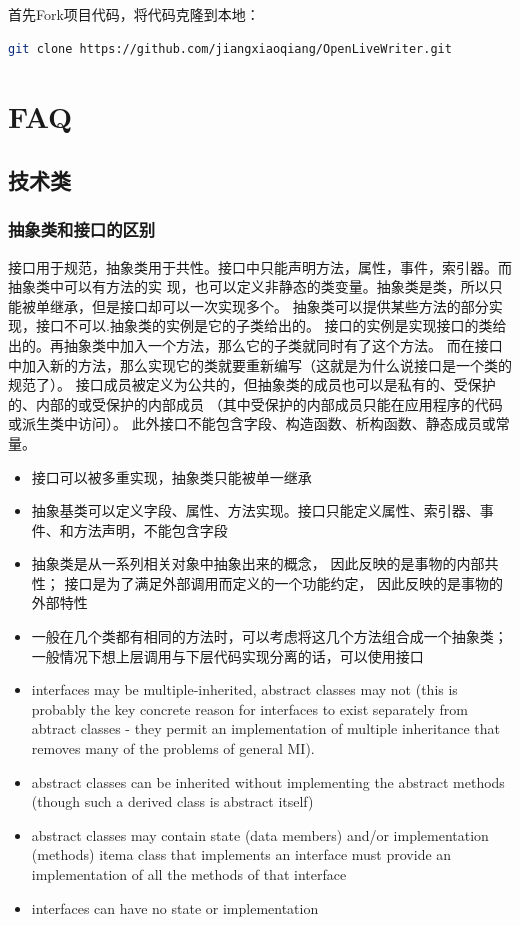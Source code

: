 \documentclass{book}
\begin{document}
首先Fork项目代码，将代码克隆到本地：

\begin{lstlisting}[language=Bash]
git clone https://github.com/jiangxiaoqiang/OpenLiveWriter.git
\end{lstlisting}

\chapter{FAQ}

\clearpage

\section{技术类}

\subsection{抽象类和接口的区别}

接口用于规范，抽象类用于共性。接口中只能声明方法，属性，事件，索引器。而抽象类中可以有方法的实
现，也可以定义非静态的类变量。抽象类是类，所以只能被单继承，但是接口却可以一次实现多个。
抽象类可以提供某些方法的部分实现，接口不可以.抽象类的实例是它的子类给出的。
接口的实例是实现接口的类给出的。再抽象类中加入一个方法，那么它的子类就同时有了这个方法。
而在接口中加入新的方法，那么实现它的类就要重新编写（这就是为什么说接口是一个类的规范了）。
接口成员被定义为公共的，但抽象类的成员也可以是私有的、受保护的、内部的或受保护的内部成员
（其中受保护的内部成员只能在应用程序的代码或派生类中访问）。
此外接口不能包含字段、构造函数、析构函数、静态成员或常量。 


\begin{itemize}
\item{接口可以被多重实现，抽象类只能被单一继承}
\item{抽象基类可以定义字段、属性、方法实现。接口只能定义属性、索引器、事件、和方法声明，不能包含字段}
\item{抽象类是从一系列相关对象中抽象出来的概念， 因此反映的是事物的内部共性；
接口是为了满足外部调用而定义的一个功能约定， 因此反映的是事物的外部特性}
\item{一般在几个类都有相同的方法时，可以考虑将这几个方法组合成一个抽象类；
一般情况下想上层调用与下层代码实现分离的话，可以使用接口}
\item{interfaces may be multiple-inherited, abstract classes may not (this 
is probably the key concrete reason for interfaces to exist separately from 
abtract classes - they permit an implementation of multiple inheritance that 
removes many of the problems of general MI).}
\item{abstract classes can be inherited without implementing the abstract 
methods (though such a derived class is abstract itself)}
\item{abstract classes may contain state (data members) and/or implementation (methods)}
item{a class that implements an interface must provide an implementation of all the methods of that interface}
\item{interfaces can have no state or implementation}
\end{itemize}
\end{document}
